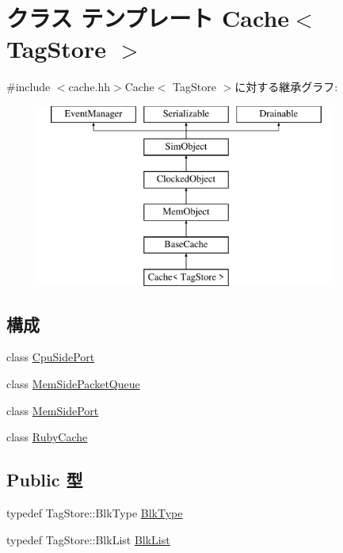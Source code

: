 \hypertarget{classCache}{
\section{クラス テンプレート Cache$<$ TagStore $>$}
\label{classCache}
}


{\ttfamily \#include $<$cache.hh$>$}Cache$<$ TagStore $>$に対する継承グラフ:\begin{figure}[H]
\begin{center}
\leavevmode
\includegraphics[height=6cm]{classCache}
\end{center}
\end{figure}
\subsection*{構成}
\begin{DoxyCompactItemize}
\item 
class \hyperlink{classCache_1_1CpuSidePort}{CpuSidePort}
\item 
class \hyperlink{classCache_1_1MemSidePacketQueue}{MemSidePacketQueue}
\item 
class \hyperlink{classCache_1_1MemSidePort}{MemSidePort}
\item 
class \hyperlink{classCache_1_1RubyCache}{RubyCache}
\end{DoxyCompactItemize}
\subsection*{Public 型}
\begin{DoxyCompactItemize}
\item 
typedef TagStore::BlkType \hyperlink{classCache_a10db52a1c10bfd238e0e3d37c4560495}{BlkType}
\item 
typedef TagStore::BlkList \hyperlink{classCache_a83744fbcce9e00711343dafa32bcb921}{BlkList}
\end{DoxyCompactItemize}

